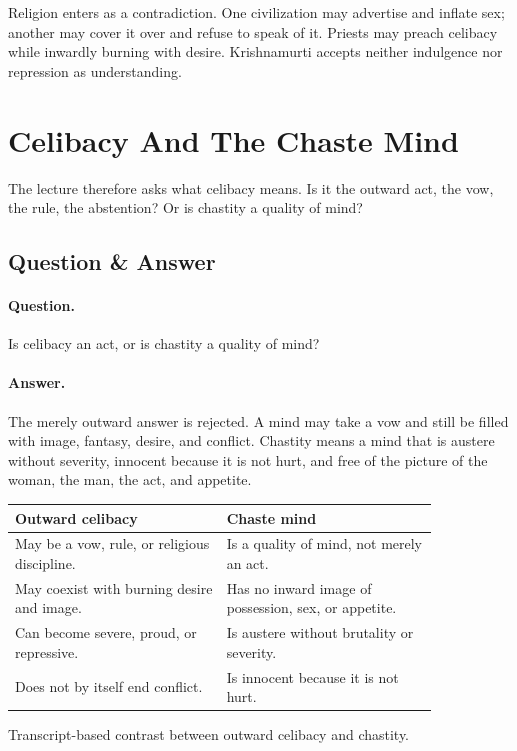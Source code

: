 \documentclass[11pt,oneside]{book}
\begin{document}
Religion enters as a contradiction. One civilization may advertise and inflate sex; another may cover it over and refuse to speak of it. Priests may preach celibacy while inwardly burning with desire. Krishnamurti accepts neither indulgence nor repression as understanding.

\section{Celibacy And The Chaste Mind}

The lecture therefore asks what celibacy means. Is it the outward act, the vow, the rule, the abstention? Or is chastity a quality of mind?

\subsection{Question \& Answer}

\paragraph{Question.}
Is celibacy an act, or is chastity a quality of mind?

\paragraph{Answer.}
The merely outward answer is rejected. A mind may take a vow and still be filled with image, fantasy, desire, and conflict. Chastity means a mind that is austere without severity, innocent because it is not hurt, and free of the picture of the woman, the man, the act, and appetite.

\begin{table}
\centering
\begin{tabular}{|p{0.42\linewidth}|p{0.42\linewidth}|}
\hline
\textbf{Outward celibacy} & \textbf{Chaste mind} \\
\hline
May be a vow, rule, or religious discipline. & Is a quality of mind, not merely an act. \\
\hline
May coexist with burning desire and image. & Has no inward image of possession, sex, or appetite. \\
\hline
Can become severe, proud, or repressive. & Is austere without brutality or severity. \\
\hline
Does not by itself end conflict. & Is innocent because it is not hurt. \\
\hline
\end{tabular}

Transcript-based contrast between outward celibacy and chastity.
\end{table}
\end{document}
